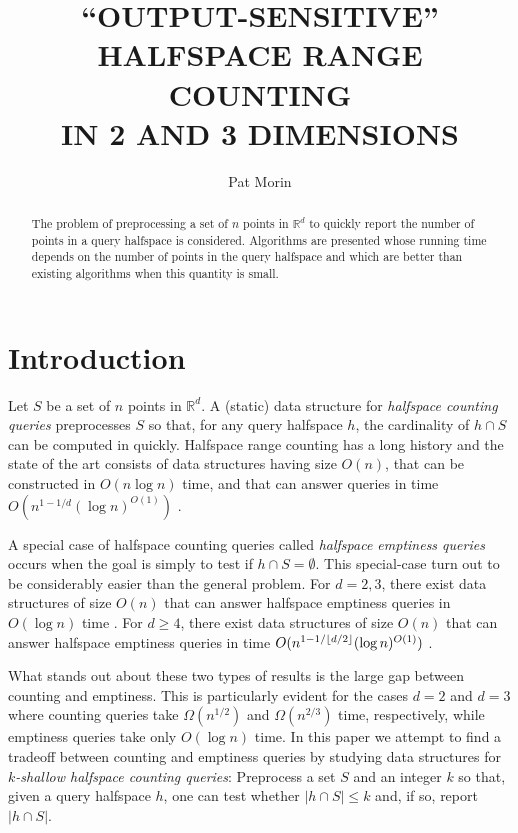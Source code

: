 \documentclass[lotsofwhite]{patmorin}
\title{\MakeUppercase{``Output-Sensitive'' Halfspace Range Counting}
           \\ \MakeUppercase{in 2 and 3 Dimensions}}
\author{Pat Morin}
\date{}
\begin{document}
\maketitle
\begin{abstract}
The problem of preprocessing a set of $n$ points in $\mathbb{R}^d$ to
quickly report the number of points in a query halfspace is
considered.  Algorithms are presented whose running time depends on
the number of points in the query halfspace and which are better than
existing algorithms when this quantity is small. 
\end{abstract}

\section{Introduction}

Let $S$ be a set of $n$ points in $\mathbb{R}^d$.  A (static) data
structure for \emph{halfspace counting queries} preprocesses $S$ so
that, for any query halfspace $h$, the cardinality of $h\cap S$ can be
computed in quickly. Halfspace range counting has a long history
\cite{aeXX} and the state of the art consists of data structures
having size $O(n)$, that can be constructed in $O(n\log n)$ time, and
that can answer queries in time $O(n^{1-1/d}(\log n)^{O(1)})$ \cite{X}.  

A special case of halfspace counting queries called \emph{halfspace
emptiness queries} occurs when the goal is simply to test if $h\cap
S=\emptyset$.  This special-case turn out to be considerably easier
than the general problem.  For $d=2,3$, there exist data structures of
size $O(n)$ that can answer halfspace emptiness queries in $O(\log n)$
time \cite{preparata-shamos,dobkin-kirkpatrick,dhks}. For $d\ge 4$,
there exist data structures of size $O(n)$ that can answer halfspace
emptiness queries in time $O(n^{1-1/\left\lfloor d/2 \right\rfloor}(\log n)^{O(1)})$
\cite{matousek-shallow}.

What stands out about these two types of results is the large gap
between counting and emptiness.  This is particularly evident for the
cases $d=2$ and $d=3$ where counting queries take $\Omega(n^{1/2})$
and $\Omega(n^{2/3})$ time, respectively, while emptiness queries take
only $O(\log n)$ time.  In this paper we attempt to find a tradeoff
between counting and emptiness queries by studying data structures for
\emph{$k$-shallow halfspace counting queries}:  Preprocess a set $S$
and an integer $k$ so that, given a query halfspace $h$, one can test
whether $|h\cap S|\le k$ and, if so, report $|h\cap S|$. 
 
\end{document}
